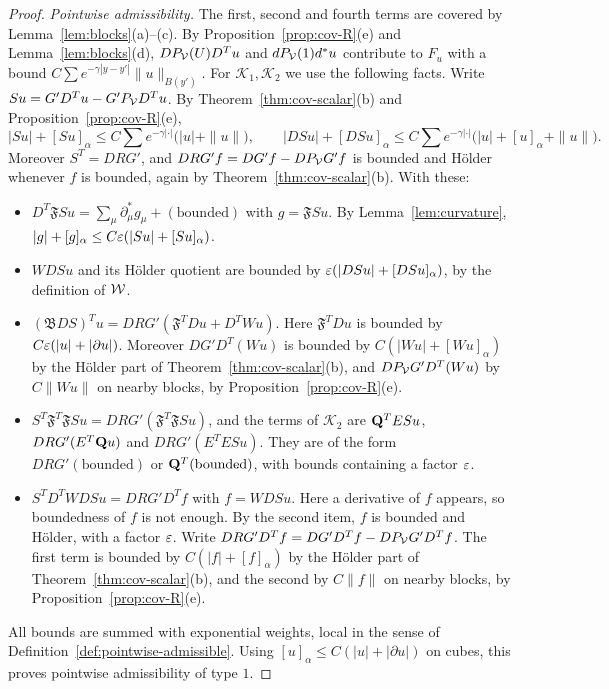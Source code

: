 \begin{proof}
\emph{Pointwise admissibility.} The first, second and fourth terms are covered by Lemma~\ref{lem:blocks}(a)--(c). By Proposition~\ref{prop:cov-R}(e) and Lemma~\ref{lem:blocks}(d), $DP_\mathcal V(U)D^Tu$ and $dP_\mathcal V(1)d^*u$ contribute to $F_u$ with a bound $C\sum e^{-\gamma|y-y'|}\|u\|_{B(y')}$. For $\mathcal K_1,\mathcal K_2$ we use the following facts. Write $Su=G'D^Tu-G'P_\mathcal V D^Tu$. By Theorem~\ref{thm:cov-scalar}(b) and Proposition~\ref{prop:cov-R}(e),
\[
|Su|+[Su]_\alpha\le C\textstyle\sum e^{-\gamma|\cdot|}\big(|u|+\|u\|\big),\qquad |DSu|+[DSu]_\alpha\le C\sum e^{-\gamma|\cdot|}\big(|u|+[u]_\alpha+\|u\|\big).
\]
Moreover $S^T=DRG'$, and $DRG'f=DG'f-DP_\mathcal V G'f$ is bounded and H\"older whenever $f$ is bounded, again by Theorem~\ref{thm:cov-scalar}(b). With these:
\begin{itemize}
\item $D^T\mathfrak FSu=\sum_\mu\partial^*_\mu g_\mu+(\text{bounded})$ with $g=\mathfrak FSu$. By Lemma~\ref{lem:curvature}, $|g|+[g]_\alpha\le C\varepsilon(|Su|+[Su]_\alpha)$.
\item $WDSu$ and its H\"older quotient are bounded by $\varepsilon(|DSu|+[DSu]_\alpha)$, by the definition of $\mathcal W$.
\item $(\mathfrak BDS)^Tu=DRG'(\mathfrak F^TDu+D^TWu)$. Here $\mathfrak F^TDu$ is bounded by $C\varepsilon(|u|+|\partial u|)$. Moreover $DG'D^T(Wu)$ is bounded by $C(|Wu|+[Wu]_\alpha)$ by the H\"older part of Theorem~\ref{thm:cov-scalar}(b), and $DP_\mathcal V G'D^T(Wu)$ by $C\|Wu\|$ on nearby blocks, by Proposition~\ref{prop:cov-R}(e).
\item $S^T\mathfrak F^T\mathfrak FSu=DRG'(\mathfrak F^T\mathfrak FSu)$, and the terms of $\mathcal K_2$ are $\mathbf Q^TESu$, $DRG'(E^T\mathbf Q u)$ and $DRG'(E^TESu)$. They are of the form $DRG'(\text{bounded})$ or $\mathbf Q^T(\text{bounded})$, with bounds containing a factor $\varepsilon$.
\item $S^TD^TWDSu=DRG'D^Tf$ with $f=WDSu$. Here a derivative of $f$ appears, so boundedness of $f$ is not enough. By the second item, $f$ is bounded and H\"older, with a factor $\varepsilon$. Write $DRG'D^Tf=DG'D^Tf-DP_\mathcal V G'D^Tf$. The first term is bounded by $C(|f|+[f]_\alpha)$ by the H\"older part of Theorem~\ref{thm:cov-scalar}(b), and the second by $C\|f\|$ on nearby blocks, by Proposition~\ref{prop:cov-R}(e).
\end{itemize}
All bounds are summed with exponential weights, local in the sense of Definition~\ref{def:pointwise-admissible}. Using $[u]_\alpha\le C(|u|+|\partial u|)$ on cubes, this proves pointwise admissibility of type $1$.


\end{proof}
